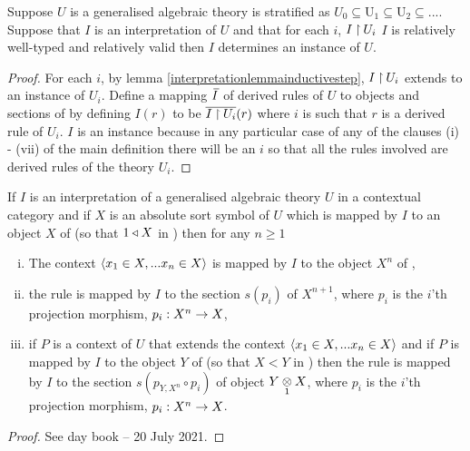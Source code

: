 \begin{lemma}
Suppose $U$ is a  generalised algebraic theory is stratified as  $U_0 \subseteq $U$_1 \subseteq $U$_2 \subseteq ...$. 
 Suppose that $I$ is an interpretation of $U$  and that  for each $i$, $I \restrict U_i$  
$I$ is relatively well-typed and relatively valid then $I$ determines an instance of $U$.
\end{lemma}
\begin{proof}
For each $i$, by lemma \ref{interpretationlemmainductivestep}, $I \restrict U_i$ extends to an instance of $U_i$. Define a mapping
$\Ibar$ of derived rules of $U$ to objects and sections of \catcw by defining $I(r)$ to be $\overline{I \restrict U_i}(r)$ where
$i$ is such that $r$ is a derived rule of $U_i$. $I$ is an instance because in any particular case of any of the clauses (i) - (vii) of the main definition 
there will be an $i$ so that all the rules involved are derived rules of the theory $U_i$. 
\end{proof}


\begin{lemma}
If $I$ is an interpretation of a generalised algebraic theory $U$ in a contextual category \catcw and if $X$ is an absolute sort symbol of $U$ which is mapped 
by $I$ to an object $X$ of \catcw (so that $1 \base X$ in \catc) then for any $n \geq 1$ 
\begin{enumerate}[(i)]
\item
The context $\tuple{\ofT{x_1}{X},...\ofT{x_n}{X}}$ is mapped by $I$ to the object $X^n$ of \catc,
\item the rule 
 is mapped by $I$ to the section $s(p_i)$ of $X^{n+1}$, where $p_i$ is the $i$'th projection morphism, $p_i: X^n \morph X$,
\item if $P$ is a context of $U$ that extends the context $\tuple{\ofT{x_1}{X},...\ofT{x_n}{X}}$ and if $P$ is mapped by $I$ to
the object $Y$ of \catcw (so that $X < Y$ in \catc) then the rule 
 is mapped by $I$ to the section $s(p_{Y,X^n}\circ p_i)$ of object $\crossx{Y}{X}{1}$, where $p_i$ is the $i$'th projection morphism, $p_i: X^n \morph X$.
\end{enumerate}
\end{lemma}
\begin{proof}
See day book -- 20 July 2021.
\end{proof}